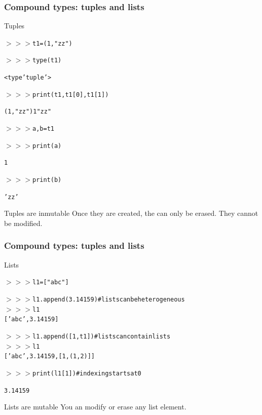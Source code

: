 \documentclass[xcolor=pdftex,dvipsnames,table,mathserif]{beamer}
\begin{document}
\begin{frame}
  \frametitle{Compound types: tuples and lists}

  \begin{block}{Tuples}
    \begin{alltt}
      $>>>$ t1 = ( 1, "zz")

      $>>>$ type(t1)

      <type 'tuple'>

      $>>>$ print(t1, t1[0], t1[1])

      (1,"zz") 1 "zz"

      $>>>$ a,b = t1

      $>>>$ print(a)

      1

      $>>>$ print(b)

      'zz'
    \end{alltt}
  \end{block}

  \begin{alertblock}{Tuples are inmutable}
    Once they are created, the can only be erased. They cannot be modified.
  \end{alertblock}
\end{frame}

\begin{frame}
  \frametitle{Compound types: tuples and lists}

  \begin{block}{Lists}
    \begin{alltt}
      $>>>$ l1=[ "abc" ]

      $>>>$ l1.append(3.14159) \# lists can be heterogeneous
      $>>>$ l1
      [ 'abc', 3.14159 ]

      $>>>$ l1.append( [ 1, t1 ] ) \# lists can contain lists
      $>>>$ l1
      ['abc', 3.14159, [1, (1, 2)]]

      $>>>$ print(l1[1]) \# indexing starts at 0

      3.14159
    \end{alltt}
  \end{block}

\begin{alertblock}{Lists are mutable}
  You an modify or erase any list element.
\end{alertblock}

\end{frame}

\end{document}
